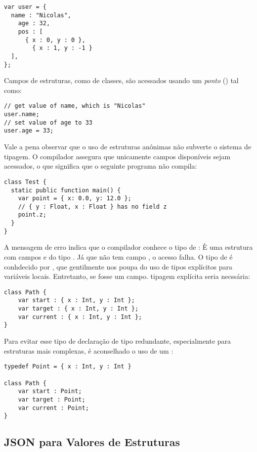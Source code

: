 
\begin{lstlisting}
var user = {
  name : "Nicolas",
	age : 32,
	pos : [
	  { x : 0, y : 0 },
		{ x : 1, y : -1 }
  ],
};
\end{lstlisting}
Campos de estruturas, como de classes, são acessados usando um \emph{ponto} () tal como:

\begin{lstlisting}
// get value of name, which is "Nicolas"
user.name;
// set value of age to 33
user.age = 33;
\end{lstlisting}
Vale a pena observar que o uso de estruturas anônimas não subverte o sistema de tipagem. O compilador assegura que unicamente campos disponíveis sejam acessados, o que significa que o seguinte programa não compila:

\begin{lstlisting}
class Test {
  static public function main() {
    var point = { x: 0.0, y: 12.0 };
    // { y : Float, x : Float } has no field z
    point.z;
  }
}
\end{lstlisting}
A mensagem de erro indica que o compilador conhece o tipo de : È uma estrutura com campos e  do tipo . Já que não tem campo , o acesso falha.
O tipo de  é conhdecido por , que gentilmente nos poupa do uso de tipos explícitos para variáveis locais. Entretanto, se  fosse um campo. tipagem explícita seria necssária:

\begin{lstlisting}
class Path {
    var start : { x : Int, y : Int };
    var target : { x : Int, y : Int };
    var current : { x : Int, y : Int };
}
\end{lstlisting}
Para evitar esse tipo de declaração de tipo redundante, especialmente para estruturas mais complexas, é aconselhado o uso de um :

\begin{lstlisting}
typedef Point = { x : Int, y : Int }

class Path {
    var start : Point;
    var target : Point;
    var current : Point;
}
\end{lstlisting}


\subsection{JSON para Valores de Estruturas}
\label{types-structure-json}

